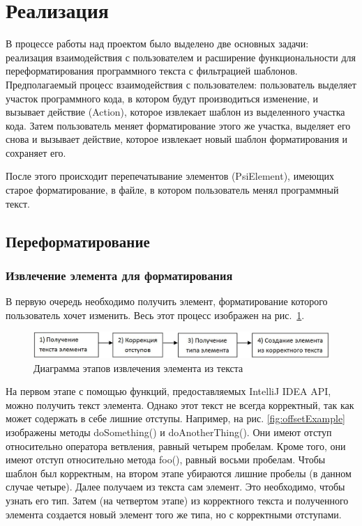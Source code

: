 \section{Реализация}
В процессе работы над проектом было выделено две основных задачи: реализация
взаимодействия с пользователем и расширение функциональности для переформатирования программного текста с фильтрацией шаблонов.
Предполагаемый процесс взаимодействия с пользователем: пользователь выделяет
участок программного кода, в котором будут производиться изменение, и вызывает 
действие (Action), которое извлекает шаблон из выделенного участка
кода. Затем пользователь меняет форматирование этого же участка, выделяет его
снова и вызывает действие, которое извлекает новый шаблон форматирования и 
сохраняет его.

После этого происходит перепечатывание элементов (PsiElement), имеющих старое
форматирование, в файле, в котором пользователь менял программный текст.

\subsection{Переформатирование}
\subsubsection{Извлечение элемента для форматирования}
В первую очередь необходимо получить элемент, форматирование которого пользователь хочет изменить.
Весь этот процесс изображен на рис.~\ref{fig:getElemDiag}.

\begin{figure}[h]
	\centering
	\includegraphics[width=\textwidth]{images/getElemDiag.jpg}
	\caption{Диаграмма этапов извлечения элемента из текста}
	\label{fig:getElemDiag}
\end{figure}

На первом этапе с помощью функций, предоставляемых IntelliJ IDEA API, можно получить текст элемента. 
Однако этот текст не всегда корректный, так как может содержать в себе лишние отступы.
Например, на рис. \ref{fig:offsetExample} изображены методы doSomething() и doAnotherThing(). 
Они имеют отступ относительно оператора ветвления, равный четырем пробелам.
Кроме того, они имеют отступ относительно метода foo(), равный восьми пробелам. 
Чтобы шаблон был корректным, на втором этапе убираются лишние пробелы (в данном случае четыре).
Далее получаем из текста сам элемент. 
Это необходимо, чтобы узнать его тип. %
Затем (на четвертом этапе) из корректного текста и полученного элемента создается новый элемент того же типа, но с корректными отступами.

